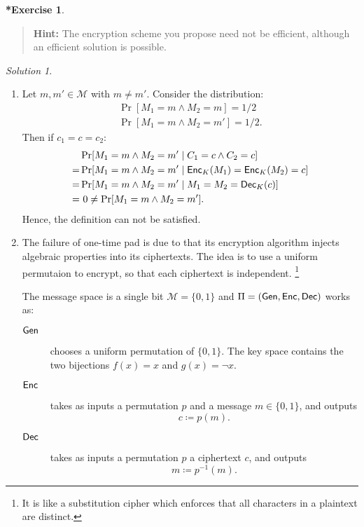 \documentclass[titlepage,reqno]{amsart}
\theoremstyle{definition}
\newtheorem{exercise*}[exercise]{*Exercise}
\theoremstyle{remark}
\newtheorem*{solution}{Solution}
\newenvironment{hint}{\begin{quote}{\bfseries Hint:}}{\end{quote}}
\newcommand{\assign}{\coloneq}
\begin{document}
\begin{exercise*}
\begin{enumerate}[label=(\alph*)]
        \begin{hint}
            The encryption scheme you propose need not be efficient, although an efficient solution is possible.
        \end{hint}
    \end{enumerate}

    \begin{solution} \hfill
        \begin{enumerate}[leftmargin=*,label=(\alph*)]
            \item Let $m, m' \in \mathcal{M}$ with $m \neq m'$. Consider the distribution:
                \begin{gather*}
                    \Pr[M_1 = m \wedge M_2 = m] = 1/2 \\
                    \Pr[M_1 = m \wedge M_2 = m'] = 1/2. 
                \end{gather*}
                Then if $c_1 = c = c_2$:
                \begin{align*}
                      &\Pr[M_1 = m \wedge M_2 = m' \mid C_1 = c \wedge C_2 = c] \\
                    = &\Pr[M_1 = m \wedge M_2 = m' \mid \mathsf{Enc}_K(M_1)= \mathsf{Enc}_K(M_2) = c] \\
                    = &\Pr[M_1 = m \wedge M_2 = m' \mid M_1 = M_2 = \mathsf{Dec}_K(c)] \\
                    = &\ 0 \neq  \Pr[M_1 = m \wedge M_2 = m'].
                \end{align*}
                Hence, the definition can not be satisfied.

            \item 
            The failure of one-time pad is due to that its encryption algorithm injects
            algebraic properties into its ciphertexts.
            The idea is to use a uniform permutaion to encrypt, so that each ciphertext
            is independent.
            \footnote{It is like a substitution cipher which enforces that all characters in a plaintext are distinct.}
            
            The message space is a single bit $\mathcal{M} = \{0,1\}$ and $\Pi = (\mathsf{Gen},\mathsf{Enc},\mathsf{Dec})$ works
            as:
            \begin{description}
                \item[$\mathsf{Gen}$] chooses a uniform permutation of $\{0,1\}$. The key space contains
                    the two bijections $f(x)=x$ and $g(x) = \neg x$.
                \item[$\mathsf{Enc}$] takes as inputs a permutation $p$ and a message $m \in \{0,1\}$, and outputs 
                    \[
                        c \assign p(m).
                    \]
                \item[$\mathsf{Dec}$] takes as inputs a permutation $p$ a ciphertext $c$, and outputs
                    \[
                        m \assign p^{-1}(m).
                    \]
            \end{description}
        

\end{enumerate}
\end{solution}
\end{exercise*}
\end{document}
